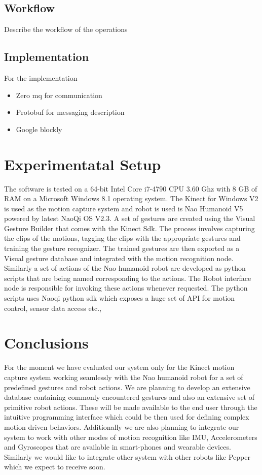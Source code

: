 \documentclass{llncs}
\begin{document}
\subsection{Workflow}
%
Describe the workflow of the operations
%
\subsection{Implementation}
%
For the implementation
\begin{itemize}
\item Zero mq for communication
\item Protobuf for messaging description
\item Google blockly
\end{itemize}
%
\section{Experimentatal Setup}
%
The software is tested on a 64-bit Intel Core i7-4790 CPU 3.60 Ghz with 8 GB of RAM on a  Microsoft Windows 8.1 operating system. The Kinect for Windows V2 is used as the motion capture system and robot is used is Nao Humanoid V5 powered by latest NaoQi OS V2.3. A set of gestures are created using the Visual Gesture Builder that comes with the Kinect Sdk\cite{Kinect2014}. The process involves capturing the clips of the motions, tagging the clips with the appropriate gestures and training the gesture recognizer. The trained gestures are then exported as a Visual gesture database and integrated with the motion recognition node. Similarly a set of actions of the Nao humanoid robot are developed as python scripts that are being named corresponding to the actions. The Robot interface node is responsible for invoking these actions whenever requested. The python scripts uses Naoqi python sdk which exposes a huge set of API for motion control, sensor data access etc.,
%
\section{Conclusions}
%
For the moment we have evaluated our system only for the Kinect motion capture system working seamlessly with the Nao humanoid robot for a set of predefined gestures and robot actions. We are planning to develop an extensive database containing commonly encountered gestures and also an extensive set of primitive robot actions. These will be made available to the end user through the intuitive programming interface which could be then used for defining complex motion driven behaviors. Additionally we are also planning to integrate our system to work with other modes of motion recognition like IMU, Accelerometers and Gyroscopes that are available in smart-phones and wearable devices. Similarly we would like to integrate other system with other robots like Pepper which we expect to receive soon.
%
\end{document}
